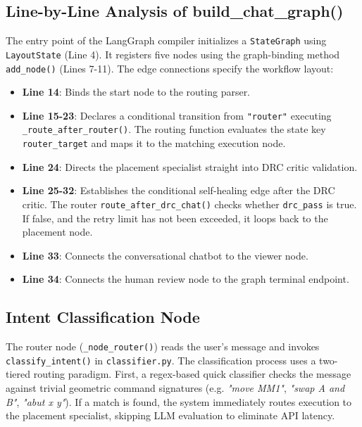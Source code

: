 \subsection{Line-by-Line Analysis of build\_chat\_graph()}
The entry point of the LangGraph compiler initializes a \texttt{StateGraph} using \texttt{LayoutState} (Line 4). It registers five nodes using the graph-binding method \texttt{add\_node()} (Lines 7-11). The edge connections specify the workflow layout:
\begin{itemize}
    \item \textbf{Line 14}: Binds the start node to the routing parser.
    \item \textbf{Line 15-23}: Declares a conditional transition from \texttt{"router"} executing \texttt{\_route\_}\allowbreak\texttt{after\_}\allowbreak\texttt{router()}. The routing function evaluates the state key \texttt{router\_target} and maps it to the matching execution node.
    \item \textbf{Line 24}: Directs the placement specialist straight into DRC critic validation.
    \item \textbf{Line 25-32}: Establishes the conditional self-healing edge after the DRC critic. The router \texttt{route\_}\allowbreak\texttt{after\_}\allowbreak\texttt{drc\_}\allowbreak\texttt{chat()} checks whether \texttt{drc\_pass} is true. If false, and the retry limit has not been exceeded, it loops back to the placement node.
    \item \textbf{Line 33}: Connects the conversational chatbot to the viewer node.
    \item \textbf{Line 34}: Connects the human review node to the graph terminal endpoint.
\end{itemize}

\subsection{Intent Classification Node}
The router node (\texttt{\_node\_}\allowbreak\texttt{router()}) reads the user's message and invokes \texttt{classify\_}\allowbreak\texttt{intent()} in \texttt{classifier.py}. The classification process uses a two-tiered routing paradigm. First, a regex-based quick classifier checks the message against trivial geometric command signatures (e.g. \emph{"move MM1"}, \emph{"swap A and B"}, \emph{"abut x y"}). If a match is found, the system immediately routes execution to the placement specialist, skipping LLM evaluation to eliminate API latency. 

